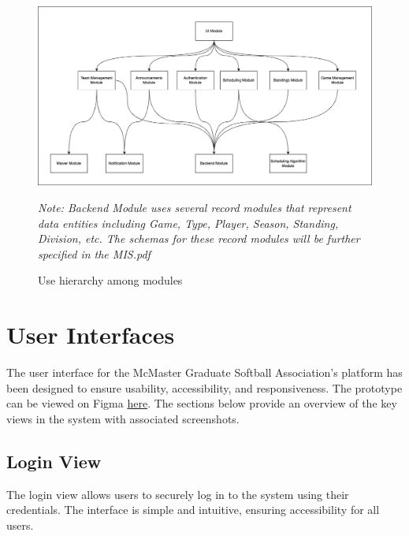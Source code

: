 \documentclass[12pt, titlepage]{article}
\begin{document}
\begin{figure}[H]
  \centering
  \includegraphics[width=1.1\textwidth]{module-decomp.png}
  \caption{Use hierarchy among modules}
  \textit{Note: Backend Module uses several record modules that represent data entities including Game, Type, Player, Season, Standing, Division, etc. The schemas for these record modules will be further specified in the MIS.pdf}
  \label{FigUH}
\end{figure}


\section{User Interfaces}

The user interface for the McMaster Graduate Softball Association's platform has been designed to ensure usability, accessibility, and responsiveness.
The prototype can be viewed on Figma \href{https://www.figma.com/proto/rm299NXqDphgHPHdfcNJfY/Softball-Capstone?node-id=17-409&p=f&t=5iRFT3K5cxIsTIDJ-1&scaling=min-zoom&content-scaling=fixed&page-id=0%3A1&starting-point-node-id=17%3A146&show-proto-sidebar=1}{here}.
The sections below provide an overview of the key views in the system with associated screenshots.

\newpage

\subsection{Login View}
The login view allows users to securely log in to the system using their credentials. The interface is simple and intuitive, ensuring accessibility for all users.
\end{document}
